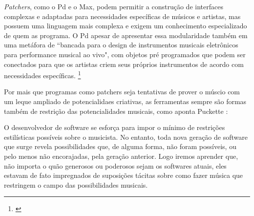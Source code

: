 \emph{Patchers}, como o Pd e o Max, podem permitir a construção de interfaces complexas e adaptadas para necessidades específicas de músicos e artistas, mas possuem uma linguagem mais complexa e exigem um conhecimento especializado de quem as programa. O Pd apesar de apresentar essa modularidade também em uma metáfora de ``bancada para o design de instrumentos musicais eletrônicos para performance musical ao vivo", com objetos pré programados que podem ser conectados para que os artistas criem seus próprios instrumentos de acordo com necessidades específicas. \footnote{\cite{PucketteMiller}}
 
Por mais que programas como patchers seja tentativas de prover o múscio com um leque ampliado de potencialidaes criativas, as ferramentas sempre são formas também de restrição das potencialidades musicais, como aponta Puckette \citeyear{PucketteMiller}:

\begin{citacao}
 O desenvolvedor de software se esforça para impor o mínimo de restrições estilísticas possíveis sobre o musicista. No entanto, toda nova geração de software que surge revela possibilidades que, de alguma forma, não foram possíveis, ou pelo menos não encorajadas, pela geração anterior. Logo iremos aprender que, não importa o quão generosos ou poderosos sejam os softwares atuais, eles estavam de fato impregnados de suposições tácitas sobre como fazer música que restringem o campo das possibilidades musicais.

\end{citacao}


